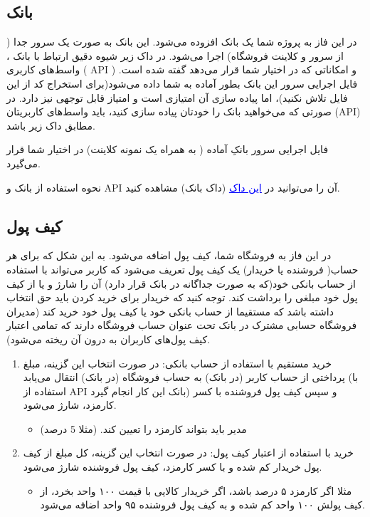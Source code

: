 \documentclass[]{article}
\begin{document}
\subsection*{{\titr بانک}}

در این فاز به پروژه شما یک بانک افزوده می‌شود. این بانک به صورت یک سرور جدا ( از سرور و کلاینت فروشگاه‌) اجرا می‌شود. در داک زیر شیوه دقیق ارتباط با بانک ، واسط‌های کاربری  ( API )‌ و امکاناتی که در اختیار شما قرار می‌دهد گفته شده است. فایل اجرایی سرور این بانک بطور آماده به شما داده می‌شود(برای استخراج کد از این فایل تلاش نکنید)، اما پیاده سازی آن امتیازی است و امتیاز قابل توجهی نیز دارد. در صورتی که می‌خواهید بانک را خودتان پیاده سازی کنید، باید واسط‌های کاربریتان (API)‌ مطابق داک زیر باشد.

فایل اجرایی سرور بانکِ آماده ( به همراه یک نمونه کلاینت) در اختیار شما قرار می‌گیرد.

نحوه استفاده از بانک و API آن را می‌توانید در \href{https://en.wikipedia.org/wiki/Apache_Maven}{\textcolor{blue}{\underline{{این داک}}}} (\textcolor{CustomColor}{داک بانک}) مشاهده کنید.

\newpage
\subsection*{{\titr کیف پول}}
در این فاز به \textcolor{CustomColor}{فروشگاه} شما، کیف پول اضافه می‌شود. به این شکل که برای هر حساب( فروشنده یا خریدار) یک کیف پول تعریف می‌شود که کاربر می‌تواند با استفاده از حساب بانکی خود(که به صورت جداگانه در بانک قرار دارد) آن را شارژ و یا از کیف پول خود مبلغی را برداشت کند. توجه کنید که خریدار برای خرید کردن باید حق انتخاب داشته باشد که مستقیما از حساب بانکی خود یا کیف پول خود خرید کند (مدیران فروشگاه حسابی مشترک در بانک تحت عنوان حساب فروشگاه دارند که تمامی اعتبار کیف پول‌های کاربران به درون آن ریخته می‌شود).


\begin{enumerate}

\item
خرید مستقیم با  استفاده از حساب بانکی: در صورت انتخاب این گزینه، مبلغ پرداختی از حساب کاربر (در بانک) به حساب فروشگاه (در بانک) انتقال می‌یابد (با استفاده از API بانک این کار انجام گیرد) و سپس کیف پول فروشنده با کسر کارمزد، شارژ‌ می‌شود.

\begin{itemize}[label=$\blacksquare$]
\item
مدیر باید بتواند کارمزد را تعیین کند. (مثلا 5 درصد)
\end{itemize}


\item
خرید با استفاده از اعتبار کیف پول:‌ در صورت انتخاب این گزینه، کل مبلغ از کیف پول خریدار کم شده و با کسر کارمزد، کیف پول فروشنده شارژ می‌شود.

\begin{itemize}[label=$\blacksquare$]
\item
مثلا اگر کارمزد ۵ درصد باشد، اگر خریدار کالایی با قیمت ۱۰۰ واحد بخرد، از کیف پولش ۱۰۰ واحد کم شده و به کیف پول فروشنده ۹۵ واحد اضافه می‌شود.
\end{itemize}

\end{enumerate}
\end{document}
